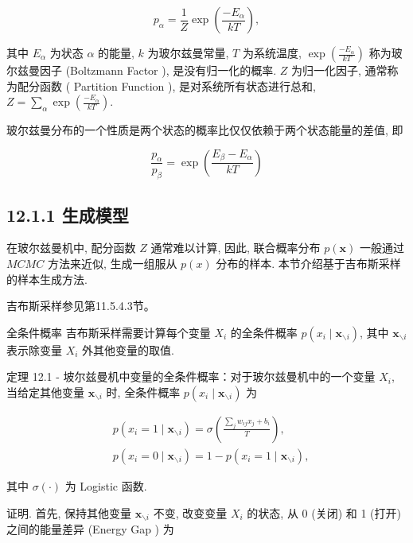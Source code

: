 \documentclass[10pt]{article}
\begin{document}
\begin{equation*}
p_{\alpha}=\frac{1}{Z} \exp \left(\frac{-E_{\alpha}}{k T}\right), \tag{12.3}
\end{equation*}


其中 $E_{\alpha}$ 为状态 $\alpha$ 的能量, $k$ 为玻尔兹曼常量, $T$ 为系统温度, $\exp \left(\frac{-E_{\alpha}}{k T}\right)$ 称为玻尔兹曼因子 (Boltzmann Factor ), 是没有归一化的概率. $Z$ 为归一化因子, 通常称为配分函数 ( Partition Function ), 是对系统所有状态进行总和, $Z=\sum_{\alpha} \exp \left(\frac{-E_{\alpha}}{k T}\right)$.

玻尔兹曼分布的一个性质是两个状态的概率比仅仅依赖于两个状态能量的差值, 即


\begin{equation*}
\frac{p_{\alpha}}{p_{\beta}}=\exp \left(\frac{E_{\beta}-E_{\alpha}}{k T}\right) \tag{12.4}
\end{equation*}


\subsection*{12.1.1 生成模型}
在玻尔兹曼机中, 配分函数 $Z$ 通常难以计算, 因此, 联合概率分布 $p(\boldsymbol{x})$ 一般通过 $M C M C$ 方法来近似, 生成一组服从 $p(x)$ 分布的样本. 本节介绍基于吉布斯采样的样本生成方法.

吉布斯采样参见第11.5.4.3节。

全条件概率 吉布斯采样需要计算每个变量 $X_{i}$ 的全条件概率 $p\left(x_{i} \mid \boldsymbol{x}_{\backslash i}\right)$, 其中 $\boldsymbol{x}_{\backslash i}$表示除变量 $X_{i}$ 外其他变量的取值.

定理 12.1 - 坡尔兹曼机中变量的全条件概率：对于玻尔兹曼机中的一个变量 $X_{i}$, 当给定其他变量 $\boldsymbol{x}_{\backslash i}$ 时, 全条件概率 $p\left(x_{i} \mid \boldsymbol{x}_{\backslash i}\right)$ 为


\begin{align*}
& p\left(x_{i}=1 \mid \boldsymbol{x}_{\backslash i}\right)=\sigma\left(\frac{\sum_{j} w_{i j} x_{j}+b_{i}}{T}\right),  \tag{12.5}\\
& p\left(x_{i}=0 \mid \boldsymbol{x}_{\backslash i}\right)=1-p\left(x_{i}=1 \mid \boldsymbol{x}_{\backslash i}\right), \tag{12.6}
\end{align*}


其中 $\sigma(\cdot)$ 为 Logistic 函数.

证明. 首先, 保持其他变量 $\boldsymbol{x}_{\backslash i}$ 不变, 改变变量 $X_{i}$ 的状态, 从 0 (关闭) 和 1 (打开) 之间的能量差异 (Energy Gap ) 为
\end{document}
